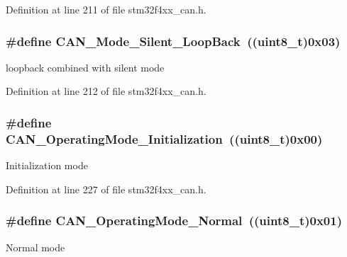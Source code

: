 Definition at line 211 of file stm32f4xx\-\_\-can.\-h.

\hypertarget{group___c_a_n__operating__mode_ga087afa0d24d2cf399225993573c984eb}{
\subsubsection[{C\-A\-N\-\_\-\-Mode\-\_\-\-Silent\-\_\-\-Loop\-Back}]{\setlength{\rightskip}{0pt plus 5cm}\#define C\-A\-N\-\_\-\-Mode\-\_\-\-Silent\-\_\-\-Loop\-Back~((uint8\-\_\-t)0x03)}}\label{group___c_a_n__operating__mode_ga087afa0d24d2cf399225993573c984eb}
loopback combined with silent mode 

Definition at line 212 of file stm32f4xx\-\_\-can.\-h.

\hypertarget{group___c_a_n__operating__mode_gace8a4b5c164aba6f473d6254ad1e8a36}{
\subsubsection[{C\-A\-N\-\_\-\-Operating\-Mode\-\_\-\-Initialization}]{\setlength{\rightskip}{0pt plus 5cm}\#define C\-A\-N\-\_\-\-Operating\-Mode\-\_\-\-Initialization~((uint8\-\_\-t)0x00)}}\label{group___c_a_n__operating__mode_gace8a4b5c164aba6f473d6254ad1e8a36}
Initialization mode 

Definition at line 227 of file stm32f4xx\-\_\-can.\-h.

\hypertarget{group___c_a_n__operating__mode_ga663ecffaa60d1a201a035dfa45325848}{
\subsubsection[{C\-A\-N\-\_\-\-Operating\-Mode\-\_\-\-Normal}]{\setlength{\rightskip}{0pt plus 5cm}\#define C\-A\-N\-\_\-\-Operating\-Mode\-\_\-\-Normal~((uint8\-\_\-t)0x01)}}\label{group___c_a_n__operating__mode_ga663ecffaa60d1a201a035dfa45325848}
Normal mode 


